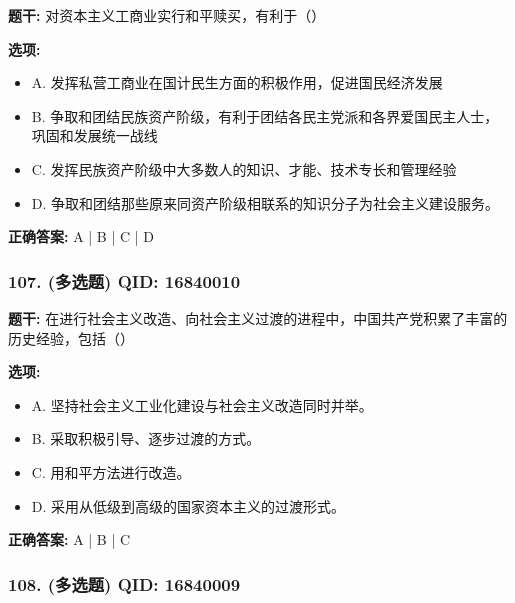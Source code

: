 \documentclass[12pt,UTF8]{ctexart}
\begin{document}
\textbf{题干:}
对资本主义工商业实行和平赎买，有利于（）

\textbf{选项:}
\begin{itemize}[leftmargin=*]

  \item A. 发挥私营工商业在国计民生方面的积极作用，促进国民经济发展

  \item B. 争取和团结民族资产阶级，有利于团结各民主党派和各界爱国民主人士，巩固和发展统一战线

  \item C. 发挥民族资产阶级中大多数人的知识、才能、技术专长和管理经验

  \item D. 争取和团结那些原来同资产阶级相联系的知识分子为社会主义建设服务。

\end{itemize}

\textbf{正确答案:}
A | B | C | D

\vspace{0.3em}\hrulefill\vspace{0.7em}

\subsubsection*{107. (多选题) \small QID: 16840010}

\textbf{题干:}
在进行社会主义改造、向社会主义过渡的进程中，中国共产党积累了丰富的历史经验，包括（）

\textbf{选项:}
\begin{itemize}[leftmargin=*]

  \item A. 坚持社会主义工业化建设与社会主义改造同时并举。

  \item B. 采取积极引导、逐步过渡的方式。

  \item C. 用和平方法进行改造。

  \item D. 采用从低级到高级的国家资本主义的过渡形式。

\end{itemize}

\textbf{正确答案:}
A | B | C

\vspace{0.3em}\hrulefill\vspace{0.7em}

\subsubsection*{108. (多选题) \small QID: 16840009}
\end{document}
